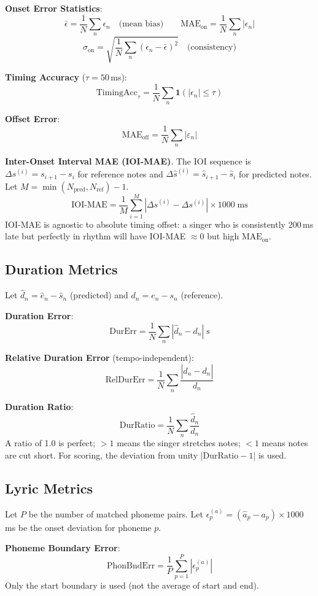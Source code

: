 \documentclass[11pt,letterpaper]{article}
\newcommand{\sh}{\hat{s}}
\newcommand{\eh}{\hat{e}}
\newcommand{\ah}{\hat{a}}
\newcommand{\dh}{\hat{d}}
\begin{document}
\textbf{Onset Error Statistics}:
\[
  \bar{\epsilon} = \frac{1}{N}\sum_n\epsilon_n \quad\text{(mean bias)}
  \qquad
  \mathrm{MAE}_\text{on} = \frac{1}{N}\sum_n|\epsilon_n|
\]
\[
  \sigma_\text{on} = \sqrt{\frac{1}{N}\sum_n(\epsilon_n - \bar{\epsilon})^2}
  \quad\text{(consistency)}
\]

\textbf{Timing Accuracy} ($\tau = 50$\,ms):
\[
  \mathrm{TimingAcc}_\tau = \frac{1}{N}\sum_n\mathbf{1}(|\epsilon_n| \le \tau)
\]

\textbf{Offset Error}:
\[
  \mathrm{MAE}_\text{off} = \frac{1}{N}\sum_n|\varepsilon_n|
\]

\textbf{Inter-Onset Interval MAE (IOI-MAE)}.
The IOI sequence is $\Delta s^{(i)} = s_{i+1} - s_i$ for reference notes and
$\Delta\sh^{(i)} = \sh_{i+1} - \sh_i$ for predicted notes.
Let $M = \min(N_\text{pred}, N_\text{ref}) - 1$.
\[
  \mathrm{IOI\text{-}MAE} = \frac{1}{M}\sum_{i=1}^{M}
    |\Delta\sh^{(i)} - \Delta s^{(i)}| \times 1000\;\text{ms}
\]
IOI-MAE is agnostic to absolute timing offset: a singer who is consistently
200\,ms late but perfectly in rhythm will have IOI-MAE $\approx 0$ but high
$\mathrm{MAE}_\text{on}$.

\subsection{Duration Metrics}

Let $\dh_n = \eh_n - \sh_n$ (predicted) and $d_n = e_n - s_n$ (reference).

\textbf{Duration Error}:
\[
  \mathrm{DurErr} = \frac{1}{N}\sum_n|\dh_n - d_n| \;\text{s}
\]

\textbf{Relative Duration Error} (tempo-independent):
\[
  \mathrm{RelDurErr} = \frac{1}{N}\sum_n\frac{|\dh_n - d_n|}{d_n}
\]

\textbf{Duration Ratio}:
\[
  \mathrm{DurRatio} = \frac{1}{N}\sum_n\frac{\dh_n}{d_n}
\]
A ratio of 1.0 is perfect; $>1$ means the singer stretches notes; $<1$ means
notes are cut short.
For scoring, the deviation from unity $|\mathrm{DurRatio} - 1|$ is used.

\subsection{Lyric Metrics}

Let $P$ be the number of matched phoneme pairs.
Let $\epsilon_p^{(a)} = (\ah_p - a_p) \times 1000$\,ms be the onset
deviation for phoneme $p$.

\textbf{Phoneme Boundary Error}:
\[
  \mathrm{PhonBndErr} = \frac{1}{P}\sum_{p=1}^{P}|\epsilon_p^{(a)}|
\]
Only the start boundary is used (not the average of start and end).
\end{document}
